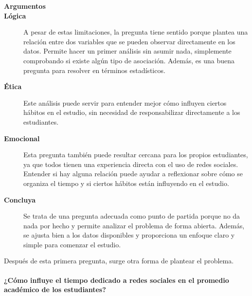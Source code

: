 \documentclass[12pt]{article}
\begin{document}
\begin{description}
\item[\textbf{Argumentos}]
\item[\textbf{Lógica}] A pesar de estas limitaciones, la pregunta tiene sentido porque plantea una relación entre dos variables que se pueden observar directamente en los datos. Permite hacer un primer análisis sin asumir nada, simplemente comprobando si existe algún tipo de asociación. Además, es una buena pregunta para resolver en términos estadísticos.
\item[\textbf{Ética}] Este análisis puede servir para entender mejor cómo influyen ciertos hábitos en el estudio, sin necesidad de responsabilizar directamente a los estudiantes.
\item[\textbf{Emocional}] Esta pregunta también puede resultar cercana para los propios estudiantes, ya que todos tienen una experiencia directa con el uso de redes sociales. Entender si hay alguna relación puede ayudar a reflexionar sobre cómo se organiza el tiempo y si ciertos hábitos están influyendo en el estudio.
\item[\textbf{Concluya}] Se trata de una pregunta adecuada como punto de partida porque no da nada por hecho y permite analizar el problema de forma abierta. Además, se ajusta bien a los datos disponibles y proporciona un enfoque claro y simple para comenzar el estudio.

\end{description}

Después de esta primera pregunta, surge otra forma de plantear el problema.
\\
\\
\textbf{¿Cómo influye el tiempo dedicado a redes sociales en el promedio académico de los estudiantes?}
\end{document}
